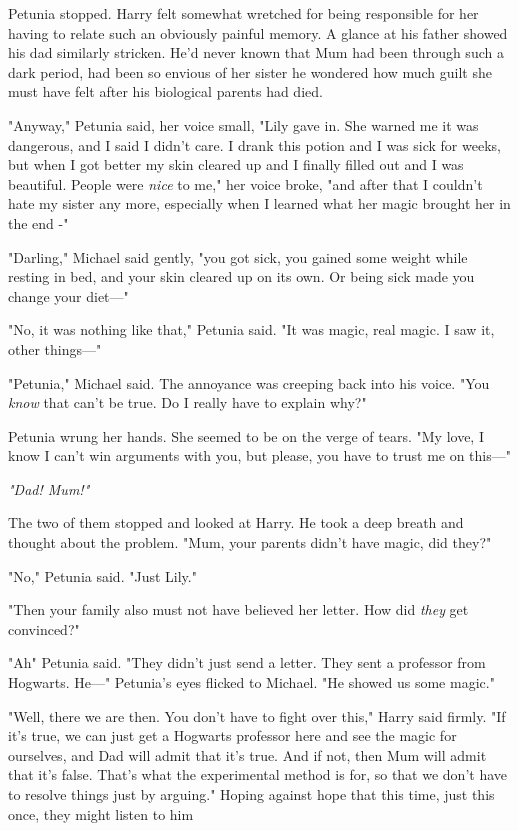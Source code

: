 Petunia stopped. Harry felt somewhat wretched for being
responsible for her having to relate such an obviously
painful memory. A glance at his father showed his dad
similarly stricken. He'd never known that Mum had been
through such a dark period, had been so envious of her
sister{\el} he wondered how much guilt she must have felt
after his biological parents had died.

"Anyway," Petunia said, her voice small, "Lily gave in. She
warned me it was dangerous, and I said I didn't care. I
drank this potion and I was sick for weeks, but when I
got better my skin cleared up and I finally filled out and{\el}
I was beautiful. People were \emph{nice} to me," her voice broke,
"and after that I couldn't hate my sister any more,
especially when I learned what her magic brought her in
the end -"

"Darling," Michael said gently, "you got sick, you gained
some weight while resting in bed, and your skin cleared up
on its own. Or being sick made you change your diet—"

"No, it was nothing like that," Petunia said. "It was magic,
real magic. I saw it, other things—"

"Petunia," Michael said. The annoyance was creeping back
into his voice. "You \emph{know} that can't be true. Do I really
have to explain why?"

Petunia wrung her hands. She seemed to be on the verge
of tears. "My love, I know I can't win arguments with you,
but please, you have to trust me on this—"

\emph{"Dad! Mum!"}

The two of them stopped and looked at Harry. He took a
deep breath and thought about the problem. "Mum, your
parents didn't have magic, did they?"

"No," Petunia said. "Just Lily."

"Then your family also must not have believed her letter.
How did \emph{they} get convinced?"

"Ah{\el}" Petunia said. "They didn't just send a letter. They
sent a professor from Hogwarts. He—" Petunia's eyes
flicked to Michael. "He showed us some magic."

"Well, there we are then. You don't have to fight over
this," Harry said firmly. "If it's true, we can just get a
Hogwarts professor here and see the magic for ourselves,
and Dad will admit that it's true. And if not, then Mum will
admit that it's false. That's what the experimental method
is for, so that we don't have to resolve things just by
arguing." Hoping against hope that this time, just this once,
they might listen to him{\el}

